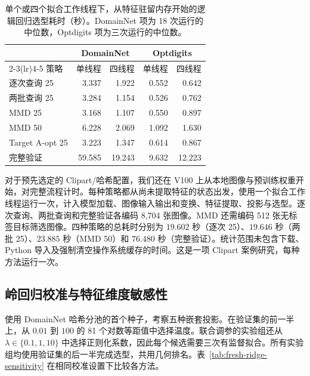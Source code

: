 \documentclass[UTF8,fontset=fandol,scheme=chinese,zihao=false,11pt,letterpaper]{ctexart}
\begin{document}
\begin{table}[!htb]
\centering
\caption{单个或四个拟合工作线程下，从特征驻留内存开始的逻辑回归选型耗时（秒）。DomainNet 项为 18 次运行的中位数，Optdigits 项为三次运行的中位数。}
\label{tab:fresh-logistic-time}
\begin{tabular}{lrrrr}
\toprule
 & \multicolumn{2}{c}{DomainNet} & \multicolumn{2}{c}{Optdigits} \\
\cmidrule(lr){2-3}\cmidrule(lr){4-5}
策略 & 单线程 & 四线程 & 单线程 & 四线程 \\
\midrule
逐次查询 25 & 3.337 & 1.922 & 0.552 & 0.642 \\
两批查询 25 & 3.284 & 1.154 & 0.526 & 0.762 \\
MMD 25 & 3.168 & 1.107 & 0.550 & 0.897 \\
MMD 50 & 6.228 & 2.069 & 1.092 & 1.630 \\
Target A-opt 25 & 3.223 & 1.347 & 0.614 & 0.867 \\
完整验证 & 59.585 & 19.243 & 9.632 & 12.223 \\
\bottomrule
\end{tabular}
\end{table}

对于预先选定的 Clipart/哈希配置，我们还在 V100 上从本地图像与预训练权重开始，对完整流程计时。每种策略都从尚未提取特征的状态出发，使用一个拟合工作线程运行一次，计入模型加载、图像输入输出和变换、特征提取、投影与选型。逐次查询、两批查询和完整验证各编码 8,704 张图像。MMD 还需编码 512 张无标签目标筛选图像。四种策略的总耗时分别为 $19.602$ 秒（逐次 25）、$19.646$ 秒（两批 25）、$23.885$ 秒（MMD 50）和 $76.480$ 秒（完整验证）。统计范围未包含下载、Python 导入及强制清空操作系统缓存的时间。这是一项 Clipart 案例研究，每种方法运行一次。

\subsection{岭回归校准与特征维度敏感性}
\label{app:fresh-ridge}

使用 DomainNet 哈希分池的首个种子，考察五种嵌套投影。在验证集的前一半上，从 $0.01$ 到 $100$ 的 81 个对数等距值中选择温度。联合调参的实验组还从 $\lambda\in\{0.1,1,10\}$ 中选择正则化系数，因此每个候选需要三次有监督拟合。所有实验组均使用验证集的后一半完成选型，共用几何排名。表~\ref{tab:fresh-ridge-sensitivity} 在相同校准设置下比较各方法。
\end{document}
